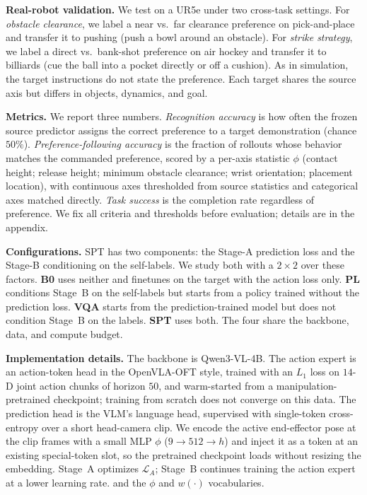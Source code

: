 \documentclass{article}
\begin{document}
\textbf{Real-robot validation.}
We test on a UR5e under two cross-task settings. 
For \emph{obstacle clearance}, we label a near vs.\ far clearance preference on pick-and-place and transfer it to pushing (push a bowl around an obstacle). 
For \emph{strike strategy}, we label a direct vs.\ bank-shot preference on air hockey and transfer it to billiards (cue the ball into a pocket directly or off a cushion). As in simulation, the
target instructions do not state the preference. Each target shares the source
axis but differs in objects, dynamics, and goal.

\textbf{Metrics.}
We report three numbers. \emph{Recognition accuracy} is how often the frozen
source predictor assigns the correct preference to a target demonstration
(chance $50\%$). \emph{Preference-following accuracy} is the fraction of rollouts
whose behavior matches the commanded preference, scored by a per-axis statistic
$\phi$ (contact height; release height; minimum obstacle clearance; wrist
orientation; placement location), with continuous axes thresholded from source
statistics and categorical axes matched directly. \emph{Task success} is the
completion rate regardless of preference. We fix all criteria and thresholds
before evaluation; details are in the appendix.


\textbf{Configurations.}
SPT has two components: the Stage-A prediction loss and the Stage-B conditioning
on the self-labels. We study both with a $2\times2$ over these factors.
\textbf{B0} uses neither and finetunes on the target with the action loss only.
\textbf{PL} conditions Stage~B on the self-labels but starts from a policy
trained without the prediction loss. \textbf{VQA} starts from the
prediction-trained model but does not condition Stage~B on the labels.
\textbf{SPT} uses both. The four share the backbone, data, and compute budget.

\textbf{Implementation details.}
The backbone is Qwen3-VL-4B. The action expert is an action-token head in the
OpenVLA-OFT style, trained with an $L_1$ loss on $14$-D joint action chunks of
horizon $50$, and warm-started from a manipulation-pretrained checkpoint;
training from scratch does not converge on this data. The prediction head is the
VLM's language head, supervised with single-token cross-entropy over a short
head-camera clip. We encode the active end-effector pose at the clip frames with
a small MLP $\phi$ ($9\!\to\!512\!\to\!h$) and inject it as a token at an
existing special-token slot, so the pretrained checkpoint loads without resizing
the embedding. Stage~A optimizes $\mathcal{L}_A$; Stage~B continues training the
action expert at a lower learning rate. 
and the $\phi$ and $w(\cdot)$ vocabularies.
\end{document}
